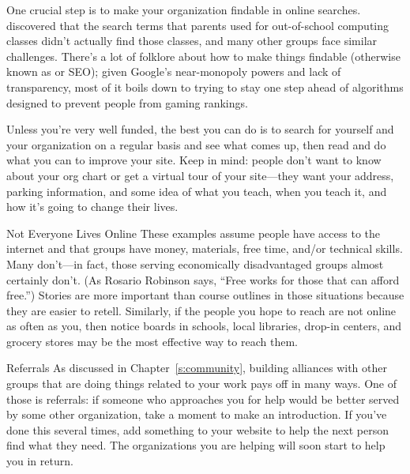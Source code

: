 One crucial step is to make your organization findable in online searches.
\cite{DiSa2014b} discovered that
the search terms that parents used for out-of-school computing classes
didn't actually find those classes,
and many other groups face similar challenges.
There's a lot of folklore about how to make things findable
(otherwise known as  or SEO);
given Google's near-monopoly powers and lack of transparency,
most of it boils down to trying to stay one step ahead of
algorithms designed to prevent people from gaming rankings.

Unless you're very well funded,
the best you can do is to search for yourself and your organization on a regular basis
and see what comes up,
then read 
and do what you can to improve your site.
Keep  in mind:
people don't want to know about your org chart or get a virtual tour of your site---they want your address,
parking information,
and some idea of what you teach,
when you teach it,
and how it's going to change their lives.

\begin{aside}{Not Everyone Lives Online}
  These examples assume people have access to the internet
  and that groups have money, materials, free time, and/or technical skills.
  Many don't---in fact,
  those serving economically disadvantaged groups almost certainly don't.
  (As Rosario Robinson says, ``Free works for those that can afford free.'')
  Stories are more important than course outlines in those situations
  because they are easier to retell.
  Similarly,
  if the people you hope to reach are not online as often as you,
  then notice boards in schools,
  local libraries,
  drop-in centers,
  and grocery stores may be the most effective way to reach them.
\end{aside}

\begin{aside}{Referrals}
  As discussed in Chapter~\ref{s:community},
  building alliances with other groups that are doing things related to your work
  pays off in many ways.
  One of those is referrals:
  if someone who approaches you for help would be better served by some other organization,
  take a moment to make an introduction.
  If you've done this several times,
  add something to your website to help the next person find what they need.
  The organizations you are helping will soon start to help you in return.
\end{aside}

